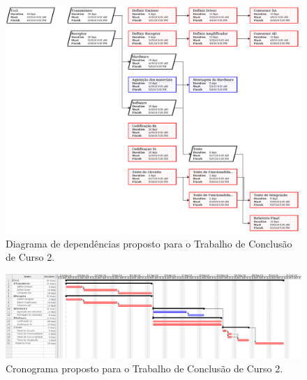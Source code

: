 \begin{apendicesenv}
\begin{figure}
	\centering
		\includegraphics[width = 18cm]{figuras/Network_diagram.png}
	\caption{Diagrama de dependências proposto para o Trabalho de Conclusão de Curso 2.}
	\label{Fig: Network_diagram}
\end{figure}

\begin{figure}
	\centering
		\includegraphics[width = 25cm, angle = 90]{figuras/Grantt_diagram.png}
	\caption{Cronograma proposto para o Trabalho de Conclusão de Curso 2.}
	\label{Fig: Grantt_diagram}
\end{figure}





\end{apendicesenv}
